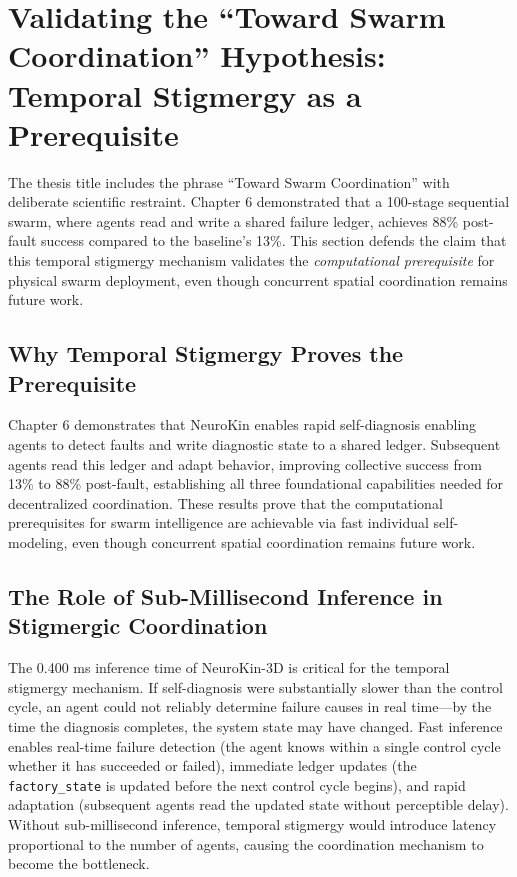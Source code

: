 \documentclass[12pt,a4paper,oneside]{report}
\begin{document}
\section{Validating the ``Toward Swarm Coordination'' Hypothesis: Temporal Stigmergy as a Prerequisite}

The thesis title includes the phrase ``Toward Swarm Coordination'' with deliberate scientific restraint. Chapter 6 demonstrated that a 100-stage sequential swarm, where agents read and write a shared failure ledger, achieves 88\% post-fault success compared to the baseline's 13\%. This section defends the claim that this temporal stigmergy mechanism validates the \textit{computational prerequisite} for physical swarm deployment, even though concurrent spatial coordination remains future work.

\subsection{Why Temporal Stigmergy Proves the Prerequisite}

Chapter 6 demonstrates that NeuroKin enables rapid self-diagnosis enabling agents to detect faults and write diagnostic state to a shared ledger. Subsequent agents read this ledger and adapt behavior, improving collective success from 13\% to 88\% post-fault, establishing all three foundational capabilities needed for decentralized coordination. These results prove that the computational prerequisites for swarm intelligence are achievable via fast individual self-modeling, even though concurrent spatial coordination remains future work.

\subsection{The Role of Sub-Millisecond Inference in Stigmergic Coordination}

The 0.400 ms inference time of NeuroKin-3D is critical for the temporal stigmergy mechanism. If self-diagnosis were substantially slower than the control cycle, an agent could not reliably determine failure causes in real time---by the time the diagnosis completes, the system state may have changed. Fast inference enables real-time failure detection (the agent knows within a single control cycle whether it has succeeded or failed), immediate ledger updates (the \texttt{factory\_state} is updated before the next control cycle begins), and rapid adaptation (subsequent agents read the updated state without perceptible delay). Without sub-millisecond inference, temporal stigmergy would introduce latency proportional to the number of agents, causing the coordination mechanism to become the bottleneck.
\end{document}
